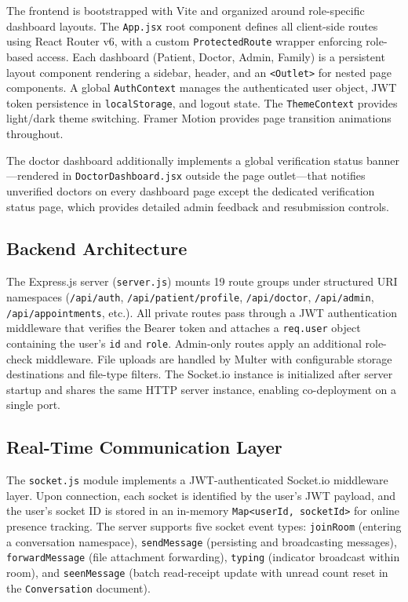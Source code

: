 The frontend is bootstrapped with Vite and organized around role-specific dashboard layouts. The \texttt{App.jsx} root component defines all client-side routes using React Router v6, with a custom \texttt{ProtectedRoute} wrapper enforcing role-based access. Each dashboard (Patient, Doctor, Admin, Family) is a persistent layout component rendering a sidebar, header, and an \texttt{<Outlet>} for nested page components. A global \texttt{AuthContext} manages the authenticated user object, JWT token persistence in \texttt{localStorage}, and logout state. The \texttt{ThemeContext} provides light/dark theme switching. Framer Motion provides page transition animations throughout.

The doctor dashboard additionally implements a global verification status banner—rendered in \texttt{DoctorDashboard.jsx} outside the page outlet—that notifies unverified doctors on every dashboard page except the dedicated verification status page, which provides detailed admin feedback and resubmission controls.

\subsection{Backend Architecture}

The Express.js server (\texttt{server.js}) mounts 19 route groups under structured URI namespaces (\texttt{/api/auth}, \texttt{/api/patient/profile}, \texttt{/api/doctor}, \texttt{/api/admin}, \texttt{/api/appointments}, etc.). All private routes pass through a JWT authentication middleware that verifies the Bearer token and attaches a \texttt{req.user} object containing the user's \texttt{id} and \texttt{role}. Admin-only routes apply an additional role-check middleware. File uploads are handled by Multer with configurable storage destinations and file-type filters. The Socket.io instance is initialized after server startup and shares the same HTTP server instance, enabling co-deployment on a single port.

\subsection{Real-Time Communication Layer}

The \texttt{socket.js} module implements a JWT-authenticated Socket.io middleware layer. Upon connection, each socket is identified by the user's JWT payload, and the user's socket ID is stored in an in-memory \texttt{Map<userId, socketId>} for online presence tracking. The server supports five socket event types: \texttt{joinRoom} (entering a conversation namespace), \texttt{sendMessage} (persisting and broadcasting messages), \texttt{forwardMessage} (file attachment forwarding), \texttt{typing} (indicator broadcast within room), and \texttt{seenMessage} (batch read-receipt update with unread count reset in the \texttt{Conversation} document).

